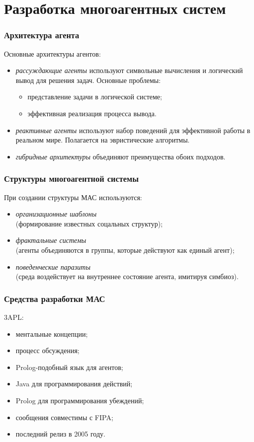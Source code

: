 \documentclass{beamer}
\begin{document}
\section{Разработка многоагентных систем}

\begin{frame}
  \frametitle{Архитектура агента}
  Основные архитектуры агентов:
  \begin{itemize}
    \item {\it рассуждающие агенты} используют символьные вычисления
      и логический вывод для решения задач. Основные проблемы:
      \begin{itemize}
        \item представление задачи в логической системе;
        \item эффективная реализация процесса вывода.
      \end{itemize}
    \item {\it реактивные агенты} используют набор поведений для
      эффективной работы в реальном мире. Полагается на эвристические
      алгоритмы.
    \item {\it гибридные архитектуры} объединяют преимущества обоих подходов.
  \end{itemize}
\end{frame}

\begin{frame}
  \frametitle{Структуры многоагентной системы}
  При создании структуры МАС используются:
  \begin{itemize}
    \item {\it организационные шаблоны} \\
      (формирование известных соцальных структур);
    \item {\it фрактальные системы} \\
      (агенты объединяются в группы, которые действуют как единый агент);
    \item {\it поведенческие паразиты} \\
      (среда воздействует на внутреннее состояние агента, имитируя симбиоз).
  \end{itemize}
\end{frame}

\begin{frame}
  \frametitle{Средства разработки МАС}
  3APL:
  \begin{itemize}
    \item ментальные концепции;
    \item процесс обсуждения;
    \item Prolog-подобный язык для агентов;
    \item Java для программирования действий;
    \item Prolog для программирования убеждений;
    \item сообщения совместимы с FIPA;
    \item последний релиз в 2005 году.
  \end{itemize}
\end{frame}
\end{document}
